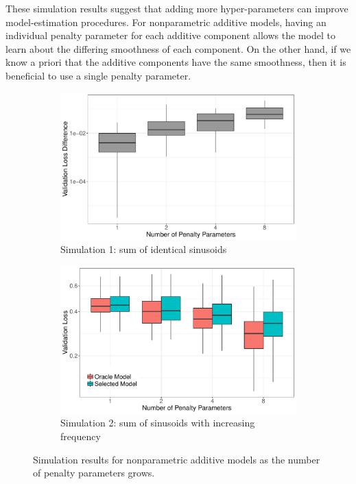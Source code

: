 \documentclass[12pt]{article} %
\theoremstyle{definition}
\begin{document}
These simulation results suggest that adding more hyper-parameters can improve model-estimation procedures. For nonparametric additive models, having an individual penalty parameter for each additive component allows the model to learn about the differing smoothness of each component. On the other hand, if we know a priori that the additive components have the same smoothness, then it is beneficial to use a single penalty parameter.

\begin{figure}
	\centering
	\begin{subfigure}{0.75\textwidth}
		\includegraphics[width=\textwidth]{../../R/figures/validation_size_loss_diff_homogeneous.pdf}
		\caption{Simulation 1: sum of identical sinusoids}
	\end{subfigure}
	\begin{subfigure}{0.75\textwidth}
		\includegraphics[width=\textwidth]{../../R/figures/validation_size_loss_heterogeneous.pdf}
		\caption{Simulation 2: sum of sinusoids with increasing frequency}
	\end{subfigure}
	\caption{
		Simulation results for nonparametric additive models as the number of penalty parameters grows.
	}
	\label{fig:simulations}
\end{figure}
\end{document}
